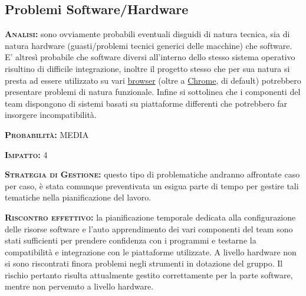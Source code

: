 \subsection{Problemi Software/Hardware}
\begin{description}
	\item{\scshape\bfseries Analisi:} sono ovviamente probabili eventuali disguidi di natura tecnica, sia di natura hardware (guasti/problemi tecnici generici delle macchine) che software. E' altresì probabile che software diversi all'interno dello stesso sistema operativo risultino di difficile integrazione, inoltre il progetto stesso che per sua natura si presta ad essere utilizzato su vari \underline{browser} (oltre a \underline{Chrome}, di default) potrebbero presentare problemi di natura funzionale. Infine si sottolinea che i componenti del team dispongono di sistemi basati su piattaforme differenti che potrebbero far insorgere incompatibilità.
	\item{\scshape\bfseries Probabilità:} MEDIA
	\item{\scshape\bfseries Impatto:} 4
	\item{\scshape\bfseries Strategia di Gestione:} questo tipo di problematiche andranno affrontate caso per caso, è stata comunque preventivata un esigua parte di tempo per gestire tali tematiche nella pianificazione del lavoro.
	\item{\scshape\bfseries Riscontro effettivo:} la pianificazione temporale dedicata alla configurazione delle risorse software e l'auto apprendimento dei vari componenti del team sono stati sufficienti per prendere confidenza con i programmi e testarne la compatibilità e integrazione con le piattaforme utilizzate.
A livello hardware non si sono riscontrati finora problemi negli strumenti in dotazione del gruppo. Il rischio pertanto risulta attualmente gestito correttamente per la parte software, mentre non pervenuto a livello hardware.
\end{description}



